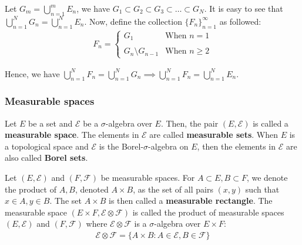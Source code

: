 \begin{proof*}
    Let $G_m = \bigcup_{n=1}^m E_n$, we have $G_1 \subset G_2 \subset G_3 \subset \dots \subset G_N$. It is easy to see that $\bigcup_{n=1}^N G_n = \bigcup_{n=1}^N E_n$. Now, define the collection $\{F_n\}_{n=1}^\infty$ as followed:
    \begin{align*}
        F_n = 
        \begin{cases}
            G_1 & \text{When } n = 1
            \\ \\
            G_{n} \setminus G_{n-1} & \text{When } n \ge 2
        \end{cases}
    \end{align*}

    \noindent Hence, we have $\bigcup_{n=1}^N F_n = \bigcup_{n=1}^N G_n \implies \bigcup_{n=1}^NF_n = \bigcup_{n=1}^N E_n$.
\end{proof*}



\subsubsection{Measurable spaces}
\begin{definition}
    Let $E$ be a set and $\mathcal{E}$ be a $\sigma$-algebra over $E$. Then, the pair $(E, \mathcal{E})$ is called a \textbf{measurable space}. The elements in $\mathcal{E}$ are called \textbf{measurable sets}. When $E$ is a topological space and $\mathcal{E}$ is the Borel-$\sigma$-algebra on $E$, then the elements in $\mathcal{E}$ are also called \textbf{Borel sets}.
\end{definition}

\begin{definition}
    Let $(E, \mathcal{E})$ and $(F, \mathcal{F})$ be measurable spaces. For $A\subset E, B\subset F$, we denote the product of $A, B$, denoted $A\times B$, as the set of all pairs $(x, y)$ such that $x \in A, y\in B$. The set $A\times B$ is then called a \textbf{measurable rectangle}. The measurable space $(E\times F, \mathcal{E} \otimes \mathcal{F})$ is called the product of measurable spaces $(E, \mathcal{E})$ and $(F, \mathcal{F})$ where $\mathcal{E} \otimes \mathcal{F}$ is a $\sigma$-algebra over $E\times F$:
    \begin{align*}
        \mathcal{E} \otimes \mathcal{F} = \Big\{ A \times B: A \in \mathcal{E}, B \in \mathcal{F} \Big\}
    \end{align*}
\end{definition}

